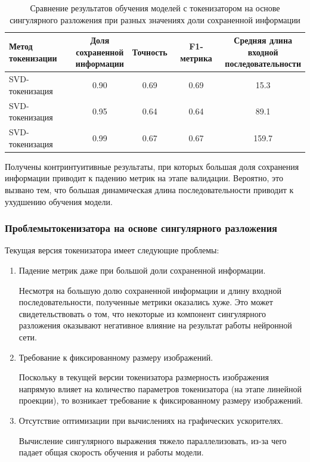 \begin{table}[H]
  \centering
  \begin{tabular}{|l|c|c|c|c|}
    \hline
    \makecell{Метод \\ токенизации}
      & \makecell{Доля \\ сохраненной \\ информации}
      & {Точность} 
      & {F1-метрика} 
      & \makecell{Средняя длина \\ входной \\ последовательности} \\ 
    \hline
    SVD-токенизация & 0.90 & 0.69 & 0.69 & 15.3 \\
    SVD-токенизация & 0.95 & 0.64 & 0.64 & 89.1 \\
    SVD-токенизация & 0.99 & 0.67 & 0.67 & 159.7 \\ \hline
  \end{tabular}
  
  \caption{Сравнение результатов обучения моделей с токенизатором на основе сингулярного разложения при разных значениях доли сохраненной информации}
  \label{tab:svd-tokenization-disp}
\end{table}

Получены контринтуитивные результаты, при которых большая доля сохранения информации приводит к падению метрик на этапе валидации. Вероятно, это вызвано тем, что большая динамическая длина последовательности приводит к ухудшению обучения модели.

\subsubsection{Проблемытокенизатора на основе сингулярного разложения}

Текущая версия токенизатора имеет следующие проблемы:

\begin{enumerate}
    \item Падение метрик даже при большой доли сохраненной информации.
    
        Несмотря на большую долю сохраненной информации и длину входной последовательности, полученные метрики оказались хуже. Это может свидетельствовать о том, что некоторые из компонент сингулярного разложения оказывают негативное влияние на результат работы нейронной сети.
    \item Требование к фиксированному размеру изображений.
    
        Поскольку в текущей версии токенизатора размерность изображения напрямую влияет на количество параметров токенизатора (на этапе линейной проекции), то возникает требование к фиксированному размеру изображений.
        
    \item Отсутствие оптимизации при вычислениях на графических ускорителях.
    
        Вычисление сингулярного выражения тяжело параллелизовать, из-за чего падает общая скорость обучения и работы модели. 
\end{enumerate}

